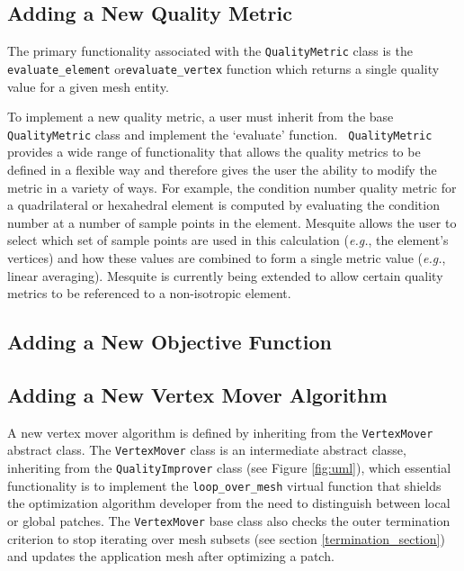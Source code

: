 \subsection{Adding a New Quality Metric} \label{sec:QualityMetricImpl}

The primary functionality associated with the {\tt QualityMetric}
class is the \texttt{evaluate\_element} or\texttt{evaluate\_vertex}  function which returns a single quality value
for a given mesh entity.

To implement a new quality metric, a user must inherit from the base
\texttt{QualityMetric} class and implement the `evaluate' function.
\texttt{ QualityMetric} provides a wide range of
functionality that allows the quality metrics to be defined in a
flexible way and therefore gives the user the ability to modify the
metric in a variety of ways.  For example, the condition number
quality metric for a quadrilateral or hexahedral element is computed
by evaluating the condition number at a number of sample points in the
element.  Mesquite allows the user to select which set of sample
points are used in this calculation ({\it e.g.}, the element's
vertices) and how these values are combined to form a single metric
value ({\it e.g.}, linear averaging).  Mesquite is currently being
extended to allow certain quality metrics to be referenced to a
non-isotropic element.

\subsection{Adding a New Objective Function}

\subsection{Adding a New Vertex Mover Algorithm}

A new vertex mover algorithm is defined by inheriting from the
\texttt{VertexMover} abstract class. The \texttt{VertexMover} class 
is an intermediate abstract classe, inheriting from the
\texttt{QualityImprover} class (see Figure \ref{fig:uml}),  which
essential functionality is to implement the \texttt{loop\_over\_mesh}
virtual function that shields the optimization algorithm developer
from the need to distinguish between local or global patches.  The
\texttt{VertexMover} base class also checks the outer termination
criterion to stop iterating over mesh subsets (see section
\ref{termination_section}) and updates the application mesh after
optimizing a patch.

